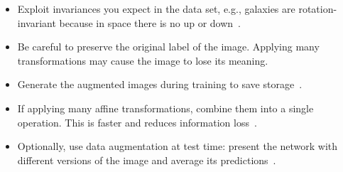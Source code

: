 \begin{itemize}
	\item Exploit invariances you expect in the data set, e.g., galaxies are rotation-invariant because in space there is no up or down~\cite{Dieleman2015}.%

	\item Be careful to preserve the original label of the image. Applying many transformations may cause the image to lose its meaning. 

	\item Generate the augmented images during training to save storage~\cite{Krizhevsky2012}.

	\item If applying many affine transformations, combine them into a single operation. This is faster and reduces information loss~\cite{Dieleman2015}.

	\item Optionally, use data augmentation at test time: present the network with different versions of the image and average its predictions~\cite{Krizhevsky2012}.
\end{itemize}

